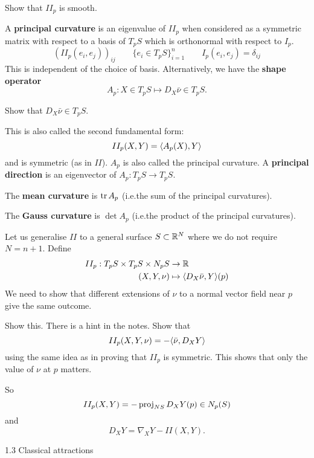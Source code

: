 \begin{exer}
  Show that $II_p$ is smooth.
\end{exer}

\begin{defn}
  \lv
  \begin{enum}
    \io
    A \textbf{principal curvature} is an eigenvalue of $II_p$ when considered as a symmetric matrix with respect to a basis of $T_pS$ which is orthonormal with respect to $I_p$.
    \[ \left( II_p(e_i,e_j) \right)_{ij} \qquad \{e_i \in T_pS\}_{i=1}^n \qquad I_p(e_i,e_j) = \delta_{ij} \]
    This is independent of the choice of basis.
    Alternatively, we have the \textbf{shape operator}
    \[ A_p: X \in T_pS \mapsto D_X \bar\nu \in T_pS. \]

    \begin{exer}
      Show that $D_X \bar\nu \in T_pS$.
    \end{exer}
    
    This is also called the second fundamental form:
    \[ II_p(X,Y) = {\left\langle A_p(X),Y \right\rangle} \]
    and is symmetric (as in $II$).
    $A_p$ is also called the principal curvature.
    A \textbf{principal direction} is an eigenvector of $A_p: T_pS \to T_pS$.

    \io
    The \textbf{mean curvature} is $\operatorname{tr} A_p$ (i.e.\@ the sum of the principal curvatures).

    \io
    The \textbf{Gauss curvature} is $\det A_p$ (i.e.\@ the product of the principal curvatures).
  \end{enum}
\end{defn}

Let us generalise $II$ to a general surface $S \subset \mathbb{R}^N$ where we do not require $N=n+1$.
Define
\begin{align*}
  II_p: T_pS \times T_pS \times N_pS &\to \mathbb{R} \\
  (X,Y,\nu) &\mapsto {\left\langle D_X\bar\nu,Y \right\rangle}(p)
\end{align*}
We need to show that different extensions of  $\nu$ to a normal vector field near $p$ give the same outcome.

\begin{exer}
  Show this.
  There is a hint in the notes.
  Show that
  \[ II_p(X,Y,\nu) = -{\left\langle \bar\nu, D_XY \right\rangle} \]
  using the same idea as in proving that $II_p$ is symmetric.
  This shows that only the value of $\nu$ at $p$ matters.
\end{exer}

So 
\[ II_p(X,Y) = -\operatorname{proj}_{NS} D_XY(p) \in N_p(S) \]
and
\[ D_XY = \nabla_XY - II(X,Y). \]

1.3 Classical attractions

